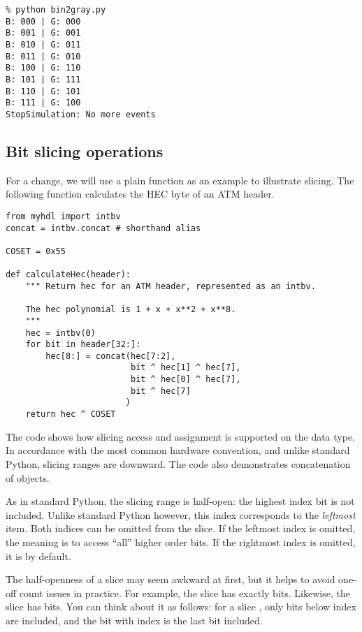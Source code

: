 \begin{verbatim}
% python bin2gray.py
B: 000 | G: 000
B: 001 | G: 001
B: 010 | G: 011
B: 011 | G: 010
B: 100 | G: 110
B: 101 | G: 111
B: 110 | G: 101
B: 111 | G: 100
StopSimulation: No more events
\end{verbatim}

\subsection{Bit slicing operations \label{intro-slicing}}

For a change, we will use a plain function as an example to illustrate
slicing.  The following function calculates the HEC byte of an ATM
header.

\begin{verbatim}
from myhdl import intbv
concat = intbv.concat # shorthand alias

COSET = 0x55

def calculateHec(header):
    """ Return hec for an ATM header, represented as an intbv.

    The hec polynomial is 1 + x + x**2 + x**8.
    """
    hec = intbv(0)
    for bit in header[32:]:
        hec[8:] = concat(hec[7:2],
                         bit ^ hec[1] ^ hec[7],
                         bit ^ hec[0] ^ hec[7],
                         bit ^ hec[7]
                        )
    return hec ^ COSET
\end{verbatim}

The code shows how slicing access and assignment is supported on the
 data type. In accordance with the most common hardware
convention, and unlike standard Python, slicing ranges are
downward. The code also demonstrates concatenation of 
objects.

As in standard Python, the slicing range is half-open: the highest
index bit is not included. Unlike standard Python however, this index
corresponds to the \emph{leftmost} item. Both indices can be omitted
from the slice. If the leftmost index is omitted, the meaning is to
access ``all'' higher order bits.  If the rightmost index is omitted,
it is  by default.

The half-openness of a slice may seem awkward at first, but it helps
to avoid one-off count issues in practice. For example, the slice
 has exactly  bits. Likewise, the slice
 has  bits. You can think about it as
follows: for a slice \code{[i:j]}, only bits below index  are
included, and the bit with index  is the last bit included.


